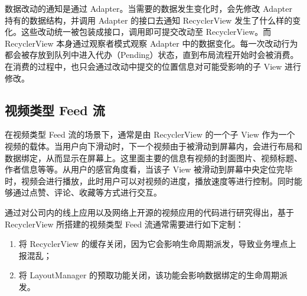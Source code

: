 数据改动的通知是通过 Adapter。当需要的数据发生变化时，会先修改 Adapter 持有的数据结构，并调用 Adapter 的接口去通知 RecyclerView 发生了什么样的变化。这些改动统一被包装成接口，调用即可提交改动至 RecyclerView。而 RecyclerView 本身通过观察者模式观察 Adapter 中的数据变化。每一次改动行为都会被存放到队列中进入代办（Pending）状态，直到布局流程开始时会被消费。在消费的过程中，也只会通过改动中提交的位置信息对可能受影响的子 View 进行修改。

\subsection{视频类型 Feed 流}

在视频类型 Feed 流的场景下，通常是由 RecyclerView 的一个子 View 作为一个视频的载体。当用户向下滑动时，下一个视频由于被滑动到屏幕内，会进行布局和数据绑定，从而显示在屏幕上。这里面主要的信息有视频的封面图片、视频标题、作者信息等等。从用户的感官角度看，当该子 View 被滑动到屏幕中央定位完毕时，视频会进行播放，此时用户可以对视频的进度，播放速度等进行控制。同时能够通过点赞、评论、收藏等方式进行交互。



通过对公司内的线上应用以及网络上开源的视频应用的代码进行研究得出，基于 RecyclerView 所搭建的视频类型 Feed 流通常需要进行如下定制：

\begin{enumerate}
    \item 将 RecyclerView 的缓存关闭，因为它会影响生命周期派发，导致业务埋点上报混乱；
    \item 将 LayoutManager 的预取功能关闭，该功能会影响数据绑定的生命周期派发。
\end{enumerate}


